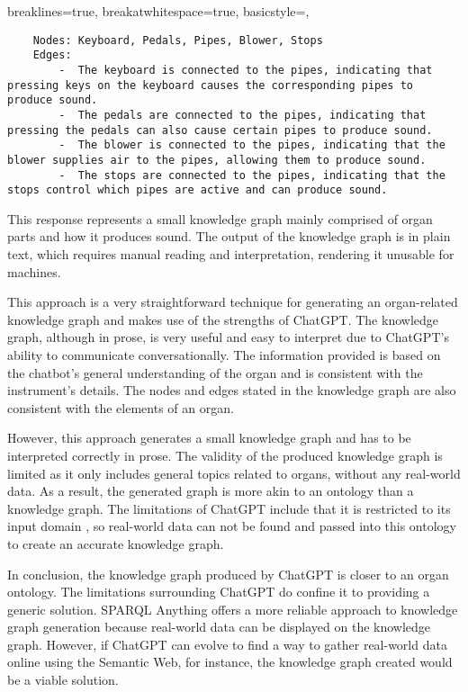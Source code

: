 \lstset
{
    breaklines=true,
    breakatwhitespace=true,
    basicstyle=\linespread{1.5}\ttfamily,
}
\begin{lstlisting}
    Nodes: Keyboard, Pedals, Pipes, Blower, Stops
    Edges:
        -  The keyboard is connected to the pipes, indicating that pressing keys on the keyboard causes the corresponding pipes to produce sound.
        -  The pedals are connected to the pipes, indicating that pressing the pedals can also cause certain pipes to produce sound.
        -  The blower is connected to the pipes, indicating that the blower supplies air to the pipes, allowing them to produce sound.
        -  The stops are connected to the pipes, indicating that the stops control which pipes are active and can produce sound.
\end{lstlisting}

This response represents a small knowledge graph mainly comprised of organ parts and how it produces sound. The output of the knowledge graph is in plain text, which requires manual reading and interpretation, rendering it unusable for machines.

This approach is a very straightforward technique for generating an organ-related knowledge graph and makes use of the strengths of ChatGPT. The knowledge graph, although in prose, is very useful and easy to interpret due to ChatGPT's ability to communicate conversationally. The information provided is based on the chatbot's general understanding of the organ and is consistent with the instrument's details. The nodes and edges stated in the knowledge graph are also consistent with the elements of an organ. 

However, this approach generates a small knowledge graph and has to be interpreted correctly in prose. The validity of the produced knowledge graph is limited as it only includes general topics related to organs, without any real-world data. As a result, the generated graph is more akin to an ontology than a knowledge graph. The limitations of ChatGPT include that it is restricted to its input domain \cite{chatgptwebsite}, so real-world data can not be found and passed into this ontology to create an accurate knowledge graph. 

In conclusion, the knowledge graph produced by ChatGPT is closer to an organ ontology. The limitations surrounding ChatGPT do confine it to providing a generic solution. SPARQL Anything offers a more reliable approach to knowledge graph generation because real-world data can be displayed on the knowledge graph. However, if ChatGPT can evolve to find a way to gather real-world data online using the Semantic Web, for instance, the knowledge graph created would be a viable solution.
